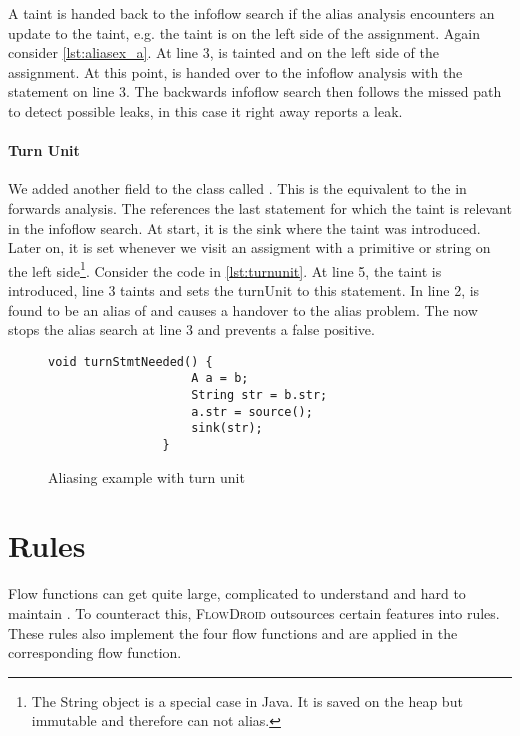 \documentclass[../draft.tex]{subfiles}
\begin{document}
    A taint is handed back to the infoflow search if the alias analysis encounters an update to the taint, e.g. the taint is on the left side of the assignment. Again consider \autoref{lst:aliasex_a}. At line 3,  is tainted and on the left side of the assignment. At this point,  is handed over to the infoflow analysis with the statement on line 3. The backwards infoflow search then follows the missed path to detect possible leaks, in this case it right away reports a leak.

    \paragraph{Turn Unit} 
    We added another field to the  class called . This is the equivalent to the  in forwards analysis. The  references the last statement for which the taint is relevant in the infoflow search. At start, it is the sink where the taint was introduced. Later on, it is set whenever we visit an assigment with a primitive or string on the left side\footnote{The String object is a special case in Java. It is saved on the heap but immutable and therefore can not alias.}. Consider the code in \autoref{lst:turnunit}. At line 5, the taint is introduced, line 3 taints  and sets the turnUnit to this statement. In line 2,  is found to be an alias of  and causes a handover to the alias problem. The  now stops the alias search at line 3 and prevents a false positive.

    \begin{figure}[ht]
        \centering
        \begin{adjustbox}{max width=\columnwidth}
            \begin{lstlisting}[gobble=16]
                void turnStmtNeeded() {
                    A a = b;
                    String str = b.str;
                    a.str = source();
                    sink(str);
                }
            \end{lstlisting}
        \end{adjustbox}
        \caption{Aliasing example with turn unit}
        \label{lst:turnunit}
    \end{figure}

    \section{Rules}
    Flow functions can get quite large, complicated to understand and hard to maintain \cite{Lerch2015}. To counteract this, \textsc{FlowDroid} outsources certain features into rules. These rules also implement the four flow functions and are applied in the corresponding flow function.
\end{document}
